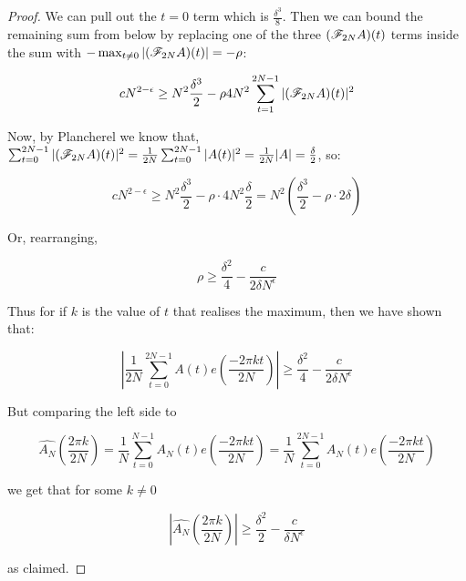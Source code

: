\documentclass{article}
\theoremstyle{definition}
\theoremstyle{remark}
\numberwithin{equation}{section}
\begin{document}
\begin{proof}
  We can pull out the $t = 0$ term which is $\frac{\delta^3}{8}$.  Then we can
  bound the remaining sum from below by replacing one of the three
  $(\mathscr{F}_{2N} A)(t)$ terms inside the sum with
  $-\max_{t\neq 0} |(\mathscr{F}_{2N} A)(t)| = -\rho$:
  
  \[cN^{2-\epsilon} \geq N^2 \frac{\delta^3}{2} - \rho 4 N^2 \sum_{t=1}^{2N-1} |(\mathscr{F}_{2N} A)(t)|^2\]

  Now, by Plancherel we know that,
  $\sum_{t=0}^{2N-1} |(\mathscr{F}_{2N}A)(t)|^2 = \frac{1}{2N}
  \sum_{t=0}^{2N-1} |A(t)|^2 = \frac{1}{2N} |A| = \frac{\delta}{2}$,
  so:

  \[cN^{2-\epsilon} \geq N^2 \frac{\delta^3}{2} - \rho \cdot 4N^2
    \frac{\delta}{2} = N^2\left(\frac{\delta^3}{2} - \rho\cdot 2
      \delta \right)\]

  Or, rearranging, 

  \[\rho \geq \frac{\delta^2}{4} - \frac{c}{2\delta N^\epsilon}\]

  Thus for if $k$ is the value of $t$ that realises the maximum, then we
  have shown that: 
  
  \[\left|\frac{1}{2N} \sum_{t=0}^{2N-1} A(t) e(\frac{-2\pi k
        t}{2N})\right| \geq \frac{\delta^2}{4} - \frac{c}{2\delta N^\epsilon}\]
  
  But comparing the left side to 
  
  \[\widehat{A_N}(\frac{2\pi k}{2N}) = \frac{1}{N}\sum_{t=0}^{N-1} A_N(t) e(\frac{-2\pi k
      t}{2N}) = \frac{1}{N}\sum_{t=0}^{2N-1} A_N(t) e(\frac{-2\pi k
      t}{2N})\]
  
  we get that for some $k \neq 0$

  \[|\widehat{A_N}(\frac{2\pi k}{2N})| \geq \frac{\delta^2}{2} - \frac{c}{\delta
      N^\epsilon}\]

  as claimed.
\end{proof}
\end{document}
